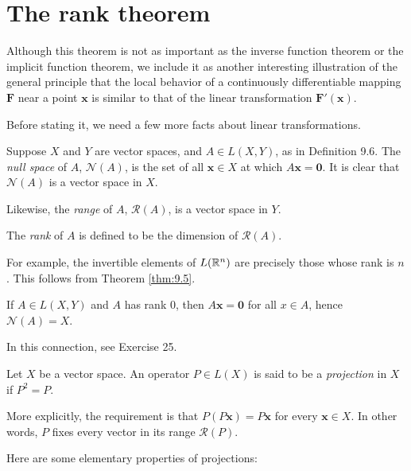 
\section{The rank theorem}

Although this theorem is not as important as the inverse function theorem or
the implicit function theorem, we include it as another interesting illustration
of the general principle that the local behavior of a continuously differentiable
mapping $\mathbf{F}$ near a point $\mathbf{x}$ is similar to that of the linear transformation $\mathbf{F'(x)}$.

Before stating it, we need a few more facts about linear transformations.

\begin{mydef}
    \label{mydef:9.30}
    Suppose $X$ and $Y$ are vector spaces, and $A \in L( X, Y)$, as in Definition 9.6. 
    The \emph{null space} of $A$, $\mathscr{N}(A)$, 
    is the set of all $\mathbf{x} \in X$ at which $A \mathbf{x = 0}$.
    It is clear that $\mathscr{N}(A)$ is a vector space in $X$.
    
    Likewise, the \emph{range} of $A$, $\mathscr{R}(A)$, is a vector space in $Y$.

    The \emph{rank} of $A$ is defined to be the dimension of $\mathscr{R}(A)$.
    
    For example, the invertible elements of $L({\protect\mathbb R}^n)$ are precisely those whose rank is $n$. This follows from Theorem \ref{thm:9.5}.
    
    If $A \in L(X, Y)$ and $A$ has rank 0, 
    then $A \mathbf{x = 0}$ for all $x \in A$, 
    hence $\mathscr{N}(A) = X$.
    
    In this connection, see Exercise 25.
\end{mydef}

\begin{mydef}
    Let $X$ be a vector space. An operator $P\in L(X)$ is said to be
    a \emph{projection} in $X$ if $P^2 = P$.

    More explicitly, the requirement is that $P(P \mathbf{x}) = P \mathbf{x}$ for every $\mathbf{x} \in X$. 
    In other words, $P$ fixes every vector in its range $\mathscr{R}(P)$.
\end{mydef}

Here are some elementary properties of projections:



